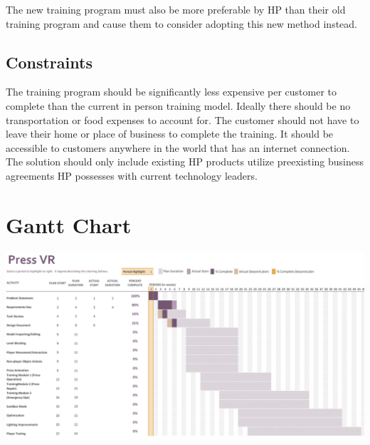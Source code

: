 \documentclass[onecolumn, draftclsnofoot,10pt, compsoc]{IEEEtran}
\begin{document}

The new training program must also be more preferable by HP than their old training program and cause them to consider adopting this new method instead.

\subsection{Constraints}
The training program should be significantly less expensive per customer to complete than the current in person training model. Ideally there should be no transportation or food expenses to account for. The customer should not have to leave their home or place of business to complete the training. It should be accessible to customers anywhere in the world that has an internet connection. The solution should only include existing HP products utilize preexisting business agreements HP possesses with current technology leaders. 

\section{Gantt Chart}
\bigskip
\includegraphics[scale=.75]{ganttChart.PNG}
\end{document}
